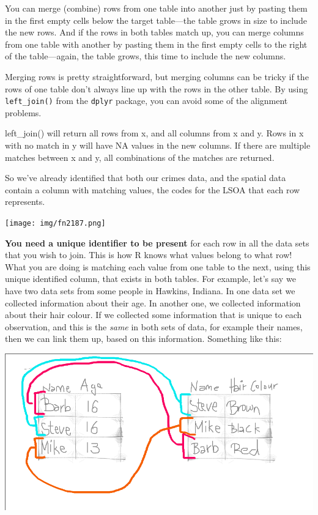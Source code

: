 \documentclass[]{book}
\begin{document}
You can merge (combine) rows from one table into another just by pasting them in the first empty cells below the target table---the table grows in size to include the new rows. And if the rows in both tables match up, you can merge columns from one table with another by pasting them in the first empty cells to the right of the table---again, the table grows, this time to include the new columns.

Merging rows is pretty straightforward, but merging columns can be tricky if the rows of one table don't always line up with the rows in the other table. By using \texttt{left\_join()} from the \texttt{dplyr} package, you can avoid some of the alignment problems.

left\_join() will return all rows from x, and all columns from x and y. Rows in x with no match in y will have NA values in the new columns. If there are multiple matches between x and y, all combinations of the matches are returned.

So we've already identified that both our crimes data, and the spatial data contain a column with matching values, the codes for the LSOA that each row represents.

\texttt{[image: img/fn2187.png]}

\textbf{You need a unique identifier to be present} for each row in all the data sets that you wish to join. This is how R knows what values belong to what row! What you are doing is matching each value from one table to the next, using this unique identified column, that exists in both tables. For example, let's say we have two data sets from some people in Hawkins, Indiana. In one data set we collected information about their age. In another one, we collected information about their hair colour. If we collected some information that is unique to each observation, and this is the \emph{same} in both sets of data, for example their names, then we can link them up, based on this information. Something like this:

\includegraphics{img/merge_logic_1.png}
\end{document}
